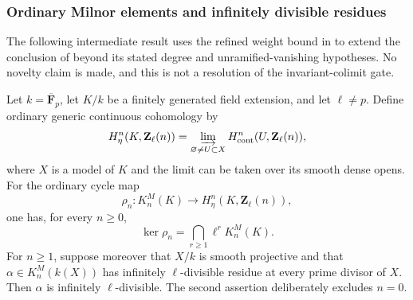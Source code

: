 \subsubsection*{Ordinary Milnor elements and infinitely divisible residues}

The following intermediate result uses the refined weight bound in
\citet[Proposition~3.7, p.~16]{BCTSchreiederDivisibility2026} to extend the
conclusion of \citet[Lemma~4.1, pp.~11--12]{BSchreiederMilnorTate2026} beyond
its stated degree and unramified-vanishing hypotheses.  No novelty claim
is made, and this is not a resolution of the invariant-colimit gate.

\begin{proposition}
\label{prop:B-Milnor-divisible-kernel}
Let $k=\overline{\mathbf F}_p$, let $K/k$ be a finitely generated field
extension, and let $\ell\ne p$.  Define ordinary generic continuous
cohomology by
\[
 H^n_\eta(K,\mathbf Z_\ell(n))
   =\varinjlim_{\varnothing\ne U\subset X}
      H^n_{\mathrm{cont}}(U,\mathbf Z_\ell(n)),
\]
where $X$ is a model of $K$ and the limit can be taken over its smooth
dense opens.  For the ordinary cycle map
\[
 \rho_n:K_n^M(K)\longrightarrow
                 H^n_\eta(K,\mathbf Z_\ell(n)),
\]
one has, for every $n\ge0$,
\[
 \ker\rho_n=\bigcap_{r\ge1}\ell^rK_n^M(K).
 \tag{B.M1}\label{eq:B-Milnor-kernel}
\]
For $n\ge1$, suppose moreover that $X/k$ is smooth projective and that
$\alpha\in K_n^M(k(X))$ has infinitely $\ell$-divisible residue at every
prime divisor of $X$.  Then $\alpha$ is infinitely $\ell$-divisible.
The second assertion deliberately excludes $n=0$.
\end{proposition}

